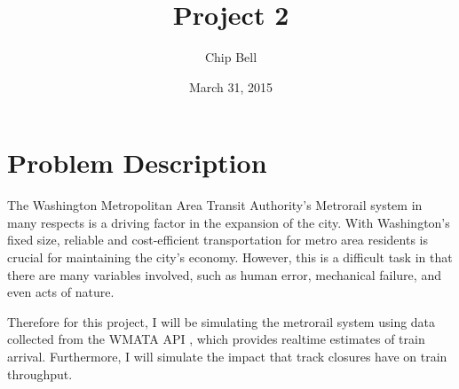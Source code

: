 \documentclass[a4paper,12pt]{article}
\begin{document}
\title{Project 2}
\author{Chip Bell}
\date{March 31, 2015}
\maketitle

\section{Problem Description}
The Washington Metropolitan Area Transit Authority's Metrorail system in many respects is a driving factor in the
expansion of the city. With Washington's fixed size, reliable and cost-efficient transportation for metro area
residents is crucial for maintaining the city's economy. However, this is a difficult task in that there are many
variables involved, such as human error, mechanical failure, and even acts of nature.

Therefore for this project, I will be simulating the metrorail system using data collected from the WMATA API
\cite{wmataapi}, which provides realtime estimates of train arrival. Furthermore, I will simulate the impact that track
closures have on train throughput.



\end{document}
